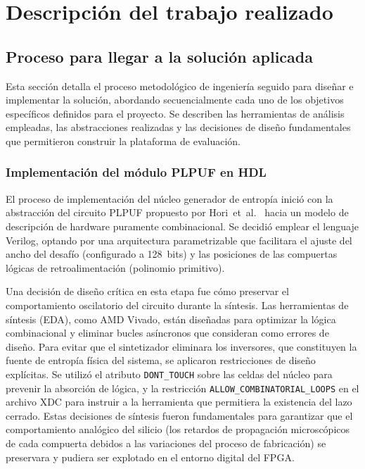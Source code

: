 
\chapter{Descripción del trabajo realizado}
\label{ch:trabajo}



\section{Proceso para llegar a la solución aplicada}
\label{sec:trabajo_proceso}

Esta sección detalla el proceso metodológico de ingeniería seguido para diseñar e
implementar la solución, abordando secuencialmente cada uno de los objetivos
específicos definidos para el proyecto. Se describen las herramientas de
análisis empleadas, las abstracciones realizadas y las decisiones de diseño
fundamentales que permitieron construir la plataforma de evaluación.

\subsection{Implementación del módulo PLPUF en HDL}
\label{sec:proc_hdl}

El proceso de implementación del núcleo generador de entropía inició con la
abstracción del circuito PLPUF propuesto por Hori~et~al.~\cite{hori_2011_pseudolfsr}
hacia un modelo de descripción de hardware puramente combinacional. Se decidió
emplear el lenguaje Verilog, optando por una arquitectura parametrizable
que facilitara el ajuste del ancho del desafío (configurado a 128~bits) y las
posiciones de las compuertas lógicas de retroalimentación (polinomio primitivo).

Una decisión de diseño crítica en esta etapa fue cómo preservar el comportamiento
oscilatorio del circuito durante la síntesis. Las herramientas de síntesis (EDA),
como AMD Vivado, están diseñadas para optimizar la lógica combinacional y
eliminar bucles asíncronos que consideran como errores de diseño. Para evitar
que el sintetizador eliminara los inversores, que constituyen la fuente de
entropía física del sistema, se aplicaron restricciones de diseño explícitas.
Se utilizó el atributo \texttt{DONT\_TOUCH} sobre las celdas del núcleo para
prevenir la absorción de lógica, y la restricción \texttt{ALLOW\_COMBINATORIAL\_LOOPS}
en el archivo XDC para instruir a la herramienta que permitiera la existencia
del lazo cerrado. Estas decisiones
de síntesis fueron fundamentales para garantizar que el comportamiento analógico del
silicio (los retardos de propagación microscópicos de cada compuerta debidos a
las variaciones del proceso de fabricación) se preservara y pudiera ser
explotado en el entorno digital del FPGA.

